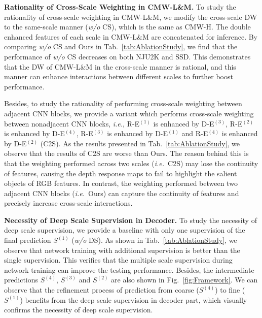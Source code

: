 \documentclass[runningheads]{llncs}
\newcommand{\ie}{\emph{i.e.}}
\begin{document}
 

\noindent\textbf{Rationality of Cross-Scale Weighting in CMW-L\&M.}
To study the rationality of cross-scale weighting in CMW-L\&M,
we modify the cross-scale DW to the same-scale
manner (\textit{w/o} CS), which is the same as CMW-H.
The double enhanced features of each scale in CMW-L\&M
are concatenated for inference.
By comparing \textit{w/o} CS and Ours in Tab.~\ref{tab:AblationStudy},
we find that the performance of \textit{w/o} CS decreases on both
NJU2K and SSD.
This demonstrates that the DW of CMW-L\&M in the
cross-scale manner is rational, and this manner can enhance
interactions between different scales to further
boost performance.


Besides, to study the rationality of performing cross-scale weighting
between adjacent CNN blocks, we provide a variant which performs cross-scale
weighting between nonadjacent CNN blocks,
\ie, R-E$^{(1)}$ is enhanced by D-E$^{(3)}$,
R-E$^{(2)}$ is enhanced by D-E$^{(4)}$,
R-E$^{(3)}$ is enhanced by D-E$^{(1)}$ and
R-E$^{(4)}$ is enhanced by D-E$^{(2)}$ (C2S).
As the results presented in Tab.~\ref{tab:AblationStudy}, we observe that the
results of C2S are worse than Ours.
The reason behind this is that the weighting performed across two scales (\ie~C2S) 
may lose the continuity of features, causing the depth response maps to fail to
highlight the salient objects of RGB features.
In contrast, the weighting performed between two adjacent CNN blocks (\ie~Ours)
can capture the continuity of features and precisely increase cross-scale interactions.



\noindent\textbf{Necessity of Deep Scale Supervision in Decoder.}
To study the necessity of deep scale supervision, we provide a baseline
with only one supervision of the final prediction $S^{(1)}$ (\textit{w/o} DS).
As shown in Tab.~\ref{tab:AblationStudy}, we observe that network training
with additional supervision is better than the single supervision.
This verifies that the multiple scale supervision during network training can
improve the testing performance.
Besides, the intermediate predictions $S^{(4)}$, $S^{(3)}$ and $S^{(2)}$
are also shown in Fig.~\ref{fig:Framework}.
We can observe that the refinement process of
prediction from coarse ($S^{(4)}$) to fine ($S^{(1)}$) benefits from the deep scale
supervision in decoder part, which visually confirms the necessity of deep scale supervision.
\end{document}
